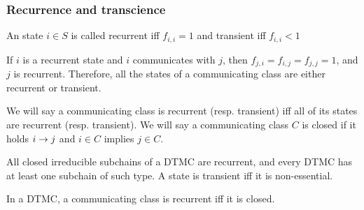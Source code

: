  \begin{frame} \frametitle{Recurrence and transcience}
    \vspace{2em}
    \begin{definition}
    An state \(i\in S\) is called recurrent iff \(f_{i,i} = 1\) and transient iff \(f_{i,i} < 1\)
    \end{definition}

    \begin{proposition}
    If \(i\) is a recurrent state and \(i\) communicates with \(j\), then
    \(f_{j,i} = f_{i,j} = f_{j,j} = 1\), and \(j\) is recurrent. Therefore, all the states of a
    communicating class are either recurrent or transient.
    \end{proposition}

    \begin{definition}
    We will say a communicating class is recurrent (resp. transient) iff all of its states
    are recurrent (resp. transient). We will say a communicating class \(C\) is closed if it
    holds \(i \rightarrow j\) and \(i\in C\) implies \(j\in C\).
    \end{definition}

    \begin{proposition}
    All closed irreducible subchains of a DTMC are recurrent, and every DTMC has
    at least one subchain of such type. A state is transient iff it is non-essential.
    \end{proposition}

    \begin{corollary}
    In a DTMC, a communicating class is recurrent iff it is closed.
    \end{corollary}

 \end{frame}